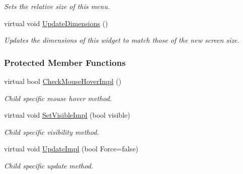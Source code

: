 \begin{DoxyCompactItemize}
\begin{DoxyCompactList}\small\item\em Sets the relative size of this menu. \item\end{DoxyCompactList}\item 
virtual void \hyperlink{classMezzanine_1_1UI_1_1Menu_a8d0e0169fb5e1c0f864670ad6d34e521}{UpdateDimensions} ()
\begin{DoxyCompactList}\small\item\em Updates the dimensions of this widget to match those of the new screen size. \item\end{DoxyCompactList}\end{DoxyCompactItemize}
\subsubsection*{Protected Member Functions}
\begin{DoxyCompactItemize}
\item 
\hypertarget{classMezzanine_1_1UI_1_1Menu_a94054405f504ec8609cd5e0d17b0dc77}{
virtual bool \hyperlink{classMezzanine_1_1UI_1_1Menu_a94054405f504ec8609cd5e0d17b0dc77}{CheckMouseHoverImpl} ()}
\label{classMezzanine_1_1UI_1_1Menu_a94054405f504ec8609cd5e0d17b0dc77}

\begin{DoxyCompactList}\small\item\em Child specific mouse hover method. \item\end{DoxyCompactList}\item 
\hypertarget{classMezzanine_1_1UI_1_1Menu_ac588517c84605052c85f5bd61400bca5}{
virtual void \hyperlink{classMezzanine_1_1UI_1_1Menu_ac588517c84605052c85f5bd61400bca5}{SetVisibleImpl} (bool visible)}
\label{classMezzanine_1_1UI_1_1Menu_ac588517c84605052c85f5bd61400bca5}

\begin{DoxyCompactList}\small\item\em Child specific visibility method. \item\end{DoxyCompactList}\item 
\hypertarget{classMezzanine_1_1UI_1_1Menu_a2b39609d1f6ec42de803f0eb34113004}{
virtual void \hyperlink{classMezzanine_1_1UI_1_1Menu_a2b39609d1f6ec42de803f0eb34113004}{UpdateImpl} (bool Force=false)}
\label{classMezzanine_1_1UI_1_1Menu_a2b39609d1f6ec42de803f0eb34113004}

\begin{DoxyCompactList}\small\item\em Child specific update method. \item\end{DoxyCompactList}\end{DoxyCompactItemize}

